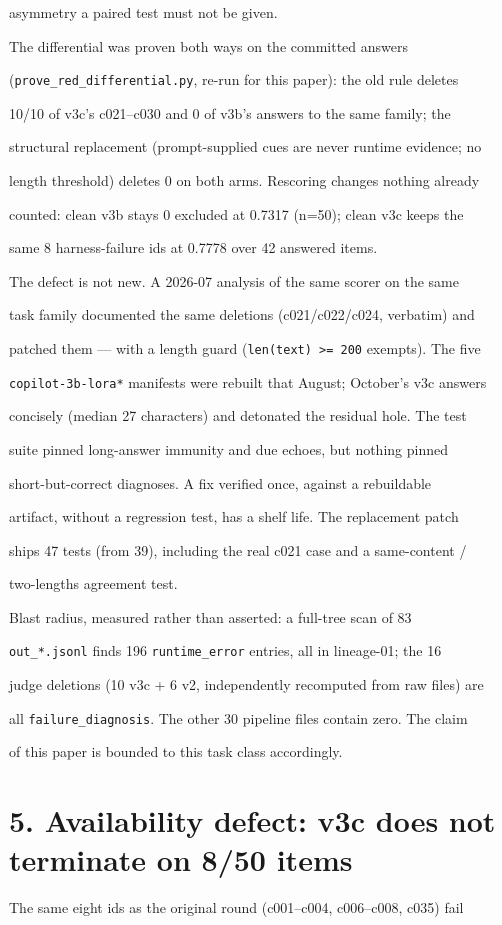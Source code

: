 \documentclass[11pt,a4paper]{article}
\begin{document}
asymmetry a paired test must not be given.

The differential was proven both ways on the committed answers

(\texttt{prove\_red\_differential.py}, re-run for this paper): the old rule deletes

10/10 of v3c's c021–c030 and 0 of v3b's answers to the same family; the

structural replacement (prompt-supplied cues are never runtime evidence; no

length threshold) deletes 0 on both arms. Rescoring changes nothing already

counted: clean v3b stays 0 excluded at 0.7317 (n=50); clean v3c keeps the

same 8 harness-failure ids at 0.7778 over 42 answered items.

The defect is not new. A 2026-07 analysis of the same scorer on the same

task family documented the same deletions (c021/c022/c024, verbatim) and

patched them — with a length guard (\texttt{len(text) >= 200} exempts). The five

\texttt{copilot-3b-lora*} manifests were rebuilt that August; October's v3c answers

concisely (median 27 characters) and detonated the residual hole. The test

suite pinned long-answer immunity and due echoes, but nothing pinned

short-but-correct diagnoses. A fix verified once, against a rebuildable

artifact, without a regression test, has a shelf life. The replacement patch

ships 47 tests (from 39), including the real c021 case and a same-content /

two-lengths agreement test.

Blast radius, measured rather than asserted: a full-tree scan of 83

\texttt{out\_*.jsonl} finds 196 \texttt{runtime\_error} entries, all in lineage-01; the 16

judge deletions (10 v3c + 6 v2, independently recomputed from raw files) are

all \texttt{failure\_diagnosis}. The other 30 pipeline files contain zero. The claim

of this paper is bounded to this task class accordingly.

\section*{5. Availability defect: v3c does not terminate on 8/50 items}
The same eight ids as the original round (c001–c004, c006–c008, c035) fail
\end{document}
